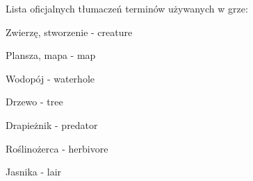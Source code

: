 Lista oficjalnych tłumaczeń terminów używanych w grze\-:


\begin{DoxyItemize}
\item Zwierzę, stworzenie -\/ creature
\item Plansza, mapa -\/ map
\item Wodopój -\/ waterhole
\item Drzewo -\/ tree
\item Drapieżnik -\/ predator
\item Roślinożerca -\/ herbivore
\item Jasnika -\/ lair 
\end{DoxyItemize}